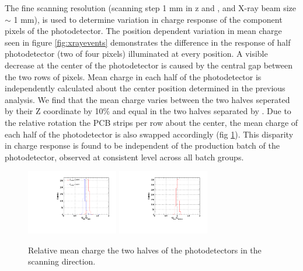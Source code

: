 The fine scanning resolution (scanning step 1 mm in z and \phis, and
X-ray beam size  $\sim$ 1 mm), is used to determine variation in
charge response of the component pixels of the photodetector.  The
position dependent variation in mean charge seen in figure
\ref{fig:xrayevents} demonstrates the difference in the response of
half photodetector  (two of four pixels) illuminated at every
position.  A visible decrease at the center of the photodetector is
caused by the central gap between the two rows of pixels.  Mean charge
in each half of the photodetector is independently calculated about
the center position determined in the previous analysis.  We find that
the mean charge varies between the two halves seperated by their Z
coordinate by 10\% and equal in the two halves separated by \phis.  Due
to the relative rotation the PCB strips per row about the center, the
mean charge of each half of the photodetector is also swapped
accordingly (fig \ref{fig:pixelcharge}). 
This disparity in charge response
is found to be independent of the production batch of the 
photodetector, observed at consistent level across all
batch groups.

\begin{figure}
\includegraphics[width=4cm]{plots/2018/qratio_z_wf.pdf}
\includegraphics[width=4cm]{plots/2018/qratio_phi_wf.pdf}
\caption{Relative mean charge the two halves of the 
photodetectors in the scanning direction.}
\label{fig:pixelcharge} 
\end{figure}



